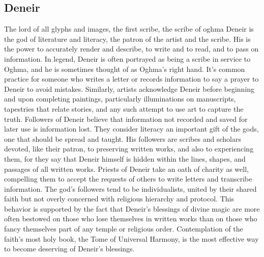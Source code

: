 \documentclass[10pt,a4paper,twoside,twocolumn,openany,bg=print,nodeprecatedcode]{dndbook}
\begin{document}
\subsection{Deneir}
The lord of all glyphs and images, the first scribe, the scribe of oghma
Deneir is the god of literature and literacy, the patron of the artist and the scribe. His is the power to accurately render and describe, to write and to read, and to pass on information. In legend, Deneir is often portrayed as being a scribe in service to Oghma, and he is sometimes thought of as Oghma's right hand.
It's common practice for someone who writes a letter or records information to say a prayer to Deneir to avoid mistakes. Similarly, artists acknowledge Deneir before beginning and upon completing paintings, particularly illuminations on manuscripts, tapestries that relate stories, and any such attempt to use art to capture the truth.
Followers of Deneir believe that information not recorded and saved for later use is information lost. They consider literacy an important gift of the gods, one that should be spread and taught. His followers are scribes and scholars devoted, like their patron, to preserving written works, and also to experiencing them, for they say that Deneir himself is hidden within the lines, shapes, and passages of all written works. Priests of Deneir take an oath of charity as well, compelling them to accept the requests of others to write letters and transcribe information.
The god's followers tend to be individualists, united by their shared faith but not overly concerned with religious hierarchy and protocol. This behavior is supported by the fact that Deneir's blessings of divine magic are more often bestowed on those who lose themselves in written works than on those who fancy themselves part of any temple or religious order. Contemplation of the faith's most holy book, the Tome of Universal Harmony, is the most effective way to become deserving of Deneir's blessings.
\end{document}
